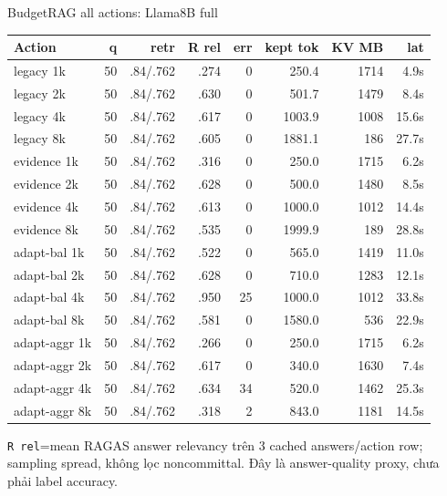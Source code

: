 \documentclass[aspectratio=169,10pt]{beamer}
\newcommand{\smallcode}[1]{\texttt{\scriptsize #1}}
\newcommand{\takeaway}[1]{%
  \vspace{0.46em}
  \noindent\colorbox{Soft}{%
    \parbox{\dimexpr\linewidth-2\fboxsep}{\color{Ink}\strut #1\strut}%
  }%
}
\begin{document}
\begin{frame}{BudgetRAG all actions: Llama8B full}
  \tiny
  \setlength{\tabcolsep}{2.6pt}
  \renewcommand{\arraystretch}{1.06}
  \begin{tabular}{>{\raggedright\arraybackslash}p{}r r r r r r r}
    \toprule
    Action & q & retr & R rel & err & kept tok & KV MB & lat \\
    \midrule
    legacy 1k & 50 & .84/.762 & .274 & 0 & 250.4 & 1714 & 4.9s \\
    legacy 2k & 50 & .84/.762 & .630 & 0 & 501.7 & 1479 & 8.4s \\
    legacy 4k & 50 & .84/.762 & .617 & 0 & 1003.9 & 1008 & 15.6s \\
    legacy 8k & 50 & .84/.762 & .605 & 0 & 1881.1 & 186 & 27.7s \\
    evidence 1k & 50 & .84/.762 & .316 & 0 & 250.0 & 1715 & 6.2s \\
    evidence 2k & 50 & .84/.762 & .628 & 0 & 500.0 & 1480 & 8.5s \\
    evidence 4k & 50 & .84/.762 & .613 & 0 & 1000.0 & 1012 & 14.4s \\
    evidence 8k & 50 & .84/.762 & .535 & 0 & 1999.9 & 189 & 28.8s \\
    adapt-bal 1k & 50 & .84/.762 & .522 & 0 & 565.0 & 1419 & 11.0s \\
    adapt-bal 2k & 50 & .84/.762 & .628 & 0 & 710.0 & 1283 & 12.1s \\
    adapt-bal 4k & 50 & .84/.762 & .950 & 25 & 1000.0 & 1012 & 33.8s \\
    adapt-bal 8k & 50 & .84/.762 & .581 & 0 & 1580.0 & 536 & 22.9s \\
    adapt-aggr 1k & 50 & .84/.762 & .266 & 0 & 250.0 & 1715 & 6.2s \\
    adapt-aggr 2k & 50 & .84/.762 & .617 & 0 & 340.0 & 1630 & 7.4s \\
    adapt-aggr 4k & 50 & .84/.762 & .634 & 34 & 520.0 & 1462 & 25.3s \\
    adapt-aggr 8k & 50 & .84/.762 & .318 & 2 & 843.0 & 1181 & 14.5s \\
    \bottomrule
  \end{tabular}
  \vspace{0.16cm}
  \takeaway{\scriptsize \smallcode{R rel}=mean RAGAS answer relevancy trên 3 cached answers/action row; sampling spread, không lọc noncommittal. Đây là answer-quality proxy, chưa phải label accuracy.}
\end{frame}
\end{document}
